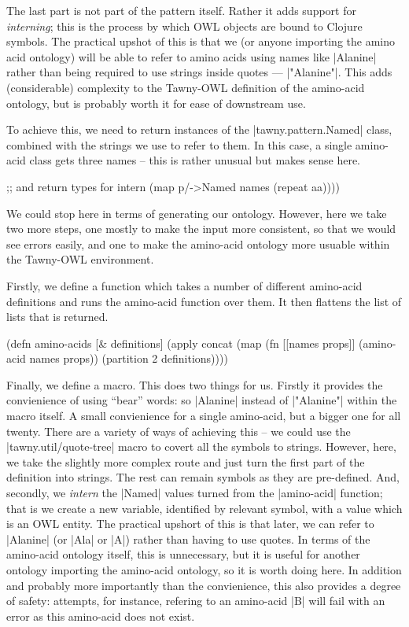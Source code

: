 The last part is not part of the pattern itself. Rather it adds support for
\emph{interning}; this is the process by which OWL objects are bound to
Clojure symbols. The practical upshot of this is that we (or anyone importing
the amino acid ontology) will be able to refer to amino acids using names like
|Alanine| rather than being required to use strings inside quotes ---
|"Alanine"|. This adds (considerable) complexity to the Tawny-OWL definition
of the amino-acid ontology, but is probably worth it for ease of downstream
use.

To achieve this, we need to return instances of the |tawny.pattern.Named|
class, combined with the strings we use to refer to them. In this case, a
single amino-acid class gets three names -- this is rather unusual but makes
sense here.

\begin{tawny}
    ;; and return types for intern
    (map p/->Named
         names
         (repeat aa))))
\end{tawny}

We could stop here in terms of generating our ontology. However, here we take
two more steps, one mostly to make the input more consistent, so that we would
see errors easily, and one to make the amino-acid ontology more usuable within
the Tawny-OWL environment.

Firstly, we define a function which takes a number of different amino-acid
definitions and runs the amino-acid function over them. It then flattens the
list of lists that is returned.

\begin{tawny}
(defn amino-acids
  [& definitions]
  (apply
   concat
   (map
    (fn [[names props]] (amino-acid names props))
    (partition 2 definitions))))
\end{tawny}

Finally, we define a macro. This does two things for us. Firstly it
provides the convienience of using ``bear'' words: so |Alanine|
instead of |"Alanine"| within the macro itself. A small convienience
for a single amino-acid, but a bigger one for all twenty. There are a
variety of ways of achieving this -- we could use the
|tawny.util/quote-tree| macro to covert all the symbols to
strings. However, here, we take the slightly more complex route and
just turn the first part of the definition into strings. The rest can
remain symbols as they are pre-defined.  And, secondly, we
\emph{intern} the |Named| values turned from the |amino-acid|
function; that is we create a new variable, identified by relevant
symbol, with a value which is an OWL entity. The practical upshort of
this is that later, we can refer to |Alanine| (or |Ala| or |A|)
rather than having to use quotes. In terms of the amino-acid ontology
itself, this is unnecessary, but it is useful for another ontology
importing the amino-acid ontology, so it is worth doing here. In
addition and probably more importantly than the convienience, this
also provides a degree of safety: attempts, for instance, refering to
an amino-acid |B| will fail with an error as this amino-acid does not
exist.

